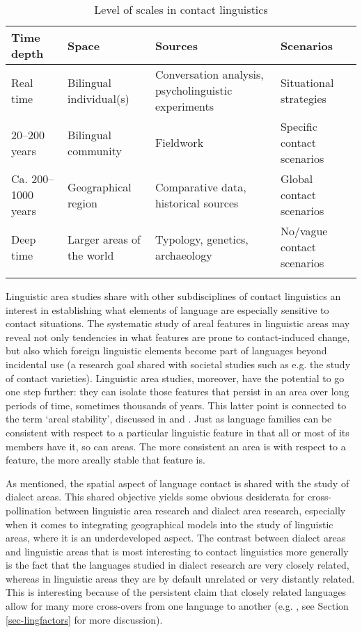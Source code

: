 \documentclass[output=paper]{langscibook}
\begin{document}
\begin{table}
\caption{Level of scales in contact linguistics  \parencite[adapted from][]{muysken2008conceptual}}
\label{tab-scales}
 \begin{tabularx}{\textwidth}{ *4{Q} } 
  \lsptoprule
         Time depth & Space & Sources & Scenarios\\ 
  \midrule
  Real time  &   Bilingual individual(s) &    Conversation analysis, psycholinguistic experiments  & Situational strategies\\
  20--200 years  &  Bilingual community &   Fieldwork &    Specific contact scenarios\\
  Ca. 200--1000 years  &   Geographical region &   Comparative data, historical sources & Global contact scenarios \\
  Deep time  &   Larger areas of the world &  Typology, genetics, archaeology   &  No/vague contact scenarios \\
  \lspbottomrule
 \end{tabularx}
\end{table}

Linguistic area studies share with other subdisciplines of contact linguistics an interest in establishing what elements of language are especially sensitive to contact situations. The systematic study of areal features in linguistic areas may reveal not only tendencies in what features are prone to contact-induced change, but also which foreign linguistic elements become part of languages beyond incidental use (a research goal shared with societal studies such as e.g. the study of contact varieties). Linguistic area studies, moreover, have the potential to go one step further: they can isolate those features that persist in an area over long periods of time, sometimes thousands of years.  This latter point is connected to the term `areal stability', discussed in \textcite{Nichols1992Linguistic} and \textcite{Nichols2003Diversity}. Just as language families can be consistent with respect to a particular linguistic feature in that all or most of its members have it, so can areas. The more consistent an area is with respect to a feature, the more areally stable that feature is. 

As mentioned, the spatial aspect of language contact is shared with the study of dialect areas. This shared objective yields some obvious desiderata for cross-pollination between linguistic area research and dialect area research, especially when it comes to integrating geographical models into the study of linguistic areas, where it is an underdeveloped aspect. The contrast between dialect areas and linguistic areas that is most interesting to contact linguistics more generally is the fact that the languages studied in dialect research are very closely related, whereas in linguistic areas they are by default unrelated or very distantly related. This is interesting because of the persistent claim that closely related languages allow for many more cross-overs from one language to another (e.g. \citealt{Weinreich1953Languages,moravcsik1975verb,winford2005contact}, see Section \ref{sec-lingfactors} for more discussion).
\end{document}
